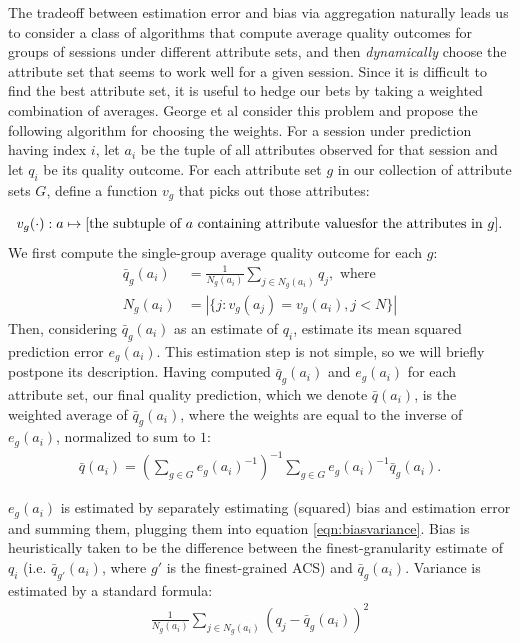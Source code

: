 \label{sec:prediction}
The tradeoff between estimation error and bias via aggregation naturally leads us to consider a class of algorithms that compute average quality outcomes for groups of sessions under different attribute sets, and then {\it dynamically} choose the attribute set that seems to work well for a given session.  Since it is difficult to find the best attribute set, it is useful to hedge our bets by taking a weighted combination of averages.  George et al \cite{george2008value} consider this problem and propose the following algorithm for choosing the weights.  For a session under prediction having index $i$, let $a_i$ be the tuple of all attributes observed for that session and let $q_i$ be its quality outcome.  For each attribute set $g$ in our collection of attribute sets $G$, define a function $v_g$ that picks out those attributes:

\begin{equation*}
  v_g(\cdot): a \mapsto \text{[the subtuple of $a$ containing attribute values} \\
  \text{for the attributes in $g$]} .
\end{equation*}
We first compute the single-group average quality outcome for each $g$:
\begin{align*}
  \bar{q}_{g}(a_i) &= \frac{1}{N_{g}(a_i)} \sum_{j \in N_{g}(a_i)} q_j, \text{ where} \\
  N_{g}(a_i) &= |\{j: v_g(a_j) = v_g(a_i), j < N\}|
\end{align*}
Then, considering $\bar{q}_{g}(a_i)$ as an estimate of $q_i$, estimate its mean squared prediction error $e_{g}(a_i)$.  This estimation step is not simple, so we will briefly postpone its description.  Having computed $\bar{q}_{g}(a_i)$ and $e_{g}(a_i)$ for each attribute set, our final quality prediction, which we denote $\bar{q}(a_i)$, is the weighted average of $\bar{q}_{g}(a_i)$, where the weights are equal to the inverse of $e_{g}(a_i)$, normalized to sum to $1$:
\begin{align*}
  \bar{q}(a_i) = (\sum_{g \in G} e_{g}(a_i)^{-1})^{-1} \sum_{g \in G} e_{g}(a_i)^{-1} \bar{q}_{g}(a_i) .
\end{align*}

$e_{g}(a_i)$ is estimated by separately estimating (squared) bias and estimation error and summing them, plugging them into equation \eqref{eqn:biasvariance}.  Bias is heuristically taken to be the difference between the finest-granularity estimate of $q_i$ (i.e. $\bar{q}_{g'}(a_i)$, where $g'$ is the finest-grained ACS) and $\bar{q}_{g}(a_i)$.  Variance is estimated by a standard formula:
\begin{align*}
  \frac{1}{N_{g}(a_i)} \sum_{j \in N_{g}(a_i)} (q_j - \bar{q}_{g}(a_i))^2
\end{align*}

